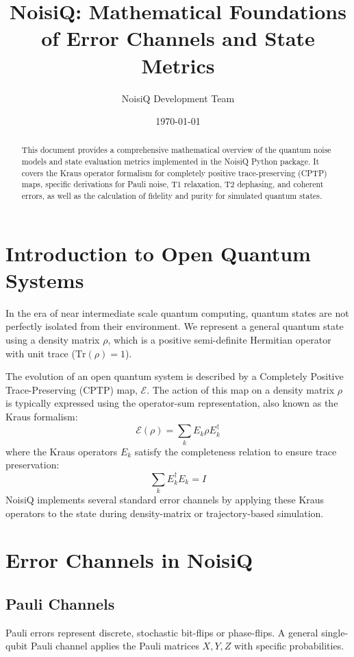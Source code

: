 \documentclass[11pt, a4paper]{article}
\title{\textbf{NoisiQ: Mathematical Foundations of Error Channels and State Metrics}}
\author{NoisiQ Development Team}
\date{\today}
\begin{document}
\maketitle

\begin{abstract}
This document provides a comprehensive mathematical overview of the quantum noise models and state evaluation metrics implemented in the NoisiQ Python package. It covers the Kraus operator formalism for completely positive trace-preserving (CPTP) maps, specific derivations for Pauli noise, T1 relaxation, T2 dephasing, and coherent errors, as well as the calculation of fidelity and purity for simulated quantum states.
\end{abstract}

\section{Introduction to Open Quantum Systems}
In the era of near intermediate scale quantum computing, quantum states are not perfectly isolated from their environment. We represent a general quantum state using a density matrix $\rho$, which is a positive semi-definite Hermitian operator with unit trace ($\text{Tr}(\rho) = 1$).

The evolution of an open quantum system is described by a Completely Positive Trace-Preserving (CPTP) map, $\mathcal{E}$. The action of this map on a density matrix $\rho$ is typically expressed using the operator-sum representation, also known as the Kraus formalism:
\begin{equation}
    \mathcal{E}(\rho) = \sum_{k} E_k \rho E_k^\dagger
\end{equation}
where the Kraus operators $E_k$ satisfy the completeness relation to ensure trace preservation:
\begin{equation}
    \sum_{k} E_k^\dagger E_k = I
\end{equation}
NoisiQ implements several standard error channels by applying these Kraus operators to the state during density-matrix or trajectory-based simulation.

\section{Error Channels in NoisiQ}

\subsection{Pauli Channels}
Pauli errors represent discrete, stochastic bit-flips or phase-flips. A general single-qubit Pauli channel applies the Pauli matrices $X, Y, Z$ with specific probabilities.
\end{document}
